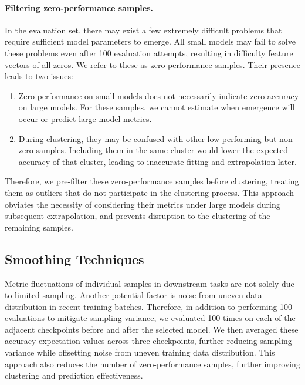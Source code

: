 \paragraph{Filtering zero-performance samples.}
In the evaluation set, there may exist a few extremely difficult problems that require sufficient model parameters to emerge. All small models may fail to solve these problems even after 100 evaluation attempts, resulting in difficulty feature vectors of all zeros. We refer to these as zero-performance samples. Their presence leads to two issues:
\begin{enumerate}[leftmargin=1.5em]
    \item Zero performance on small models does not necessarily indicate zero accuracy on large models. For these samples, we cannot estimate when emergence will occur or predict large model metrics.
    \item During clustering, they may be confused with other low-performing but non-zero samples. Including them in the same cluster would lower the expected accuracy of that cluster, leading to inaccurate fitting and extrapolation later.
\end{enumerate}

Therefore, we pre-filter these zero-performance samples before clustering, treating them as outliers that do not participate in the clustering process. 
This approach obviates the necessity of considering their metrics under large models during subsequent extrapolation, and prevents disruption to the clustering of the remaining samples.



\subsection{Smoothing Techniques}
\label{sec:smoothing}
Metric fluctuations of individual samples in downstream tasks are not solely due to limited sampling. Another potential factor is noise from uneven data distribution in recent training batches. Therefore, in addition to performing 100 evaluations to mitigate sampling variance, we evaluated 100 times on each of the adjacent checkpoints before and after the selected model. We then averaged these accuracy expectation values across three checkpoints, further reducing sampling variance while offsetting noise from uneven training data distribution. This approach also reduces the number of zero-performance samples, further improving clustering and prediction effectiveness.






